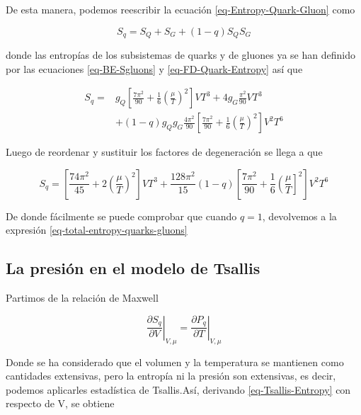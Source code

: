 De esta manera, podemos reescribir la ecuación \eqref{eq-Entropy-Quark-Gluon} como

\begin{equation} 
{S}_{q} = {S}_{Q} + {S}_{G} + (1-q) {S}_{Q}{S}_{G}
\end{equation}

donde las entropías de los subsistemas de quarks y de gluones ya se han definido por las ecuaciones  \eqref{eq-BE-Sgluons} y \eqref{eq-FD-Quark-Entropy} así que 

\begin{equation}
\begin{split}
{S}_{q} = & {g}_{Q} \left[\frac{7{\pi}^{2}}{90} + \frac{1}{6} \left(\frac{\mu}{T} \right)^{2} \right] V{T}^{3} + 4{g}_{G} \frac{{\pi}^{2}}{90} V {T}^{3} \\
& + \left(1-q \right) {g}_{Q}{g}_{G} \frac{4{\pi}^{2}}{90} \left[\frac{7{\pi}^{2}}{90} + \frac{1}{6} \left(\frac{\mu}{T} \right)^{2}\right]{V}^{2}{T}^{6}
\end{split}
\end{equation}

Luego de reordenar y sustituir los factores de degeneración se llega a que

\begin{equation}\label{eq-Tsallis-Entropy}
{S}_{q} = \left[\frac{74{\pi}^{2}}{45} + 2 \left(\frac{\mu}{T} \right)^{2} \right]V{T}^{3} +  \frac{128{\pi}^{2}}{15} (1 - q) \left[\frac{7{\pi}^{2}}{90} + \frac{1}{6} \left(\frac{\mu}{T} \right]^{2} \right]{V}^{2}{T}^{6}
\end{equation}

De donde fácilmente se puede comprobar que cuando $q=1$, devolvemos a la expresión \eqref{eq-total-entropy-quarks-gluons} 

\subsection{La presión en el modelo de Tsallis}

Partimos de la relación de Maxwell

\begin{equation}\label{eq-Max-rel-S-P}
\left. \frac{\partial{S}_{q}}{\partial V} \right|_{V,\mu} = \left. \frac{\partial{P}_{q}}{\partial T} \right|_{V,\mu}
\end{equation}

Donde se ha considerado que el volumen y la temperatura se mantienen como cantidades extensivas, pero la entropía ni la presión son extensivas, es decir, podemos aplicarles estadística de Tsallis.Así, derivando \eqref{eq-Tsallis-Entropy} con respecto de V, se obtiene 

